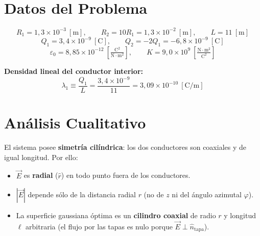 \documentclass[12pt,letterpaper]{article}
\begin{document}
\begin{center}
\end{center}

\section*{Datos del Problema}

\[
    R_1 = 1{,}3\times10^{-3}\ [\text{m}],\qquad
    R_2 = 10R_1 = 1{,}3\times10^{-2}\ [\text{m}],\qquad
    L   = 11\ [\text{m}]
\]
\[
    Q_1 = 3{,}4\times10^{-9}\ [\text{C}],\qquad
    Q_2 = -2Q_1 = -6{,}8\times10^{-9}\ [\text{C}]
\]
\[
    \varepsilon_0 = 8{,}85\times10^{-12}
    \ \left[\tfrac{\text{C}^2}{\text{N}\cdot\text{m}^2}\right],\qquad
    K = 9{,}0\times10^{9}
    \ \left[\tfrac{\text{N}\cdot\text{m}^2}{\text{C}^2}\right]
\]

\noindent\textbf{Densidad lineal del conductor interior:}
\[
    \lambda_1 \equiv \frac{Q_1}{L}
    = \frac{3{,}4\times10^{-9}}{11}
    = 3{,}09\times10^{-10}\ [\text{C/m}]
\]

\section*{An\'alisis Cualitativo}

El sistema posee \textbf{simetr\'ia cil\'indrica}: los dos conductores son coaxiales y
de igual longitud. Por ello:
\begin{itemize}
    \item $\vec{E}$ es \textbf{radial} ($\hat{r}$) en todo punto fuera de los conductores.
    \item $|\vec{E}|$ depende s\'olo de la distancia radial $r$ (no de $z$ ni del \'angulo
          azimutal $\varphi$).
    \item La superficie gaussiana \'optima es un \textbf{cilindro coaxial} de radio $r$
          y longitud $\ell$ arbitraria (el flujo por las tapas es nulo porque
          $\vec{E}\perp\hat{n}_\text{tapa}$).
\end{itemize}
\end{document}
